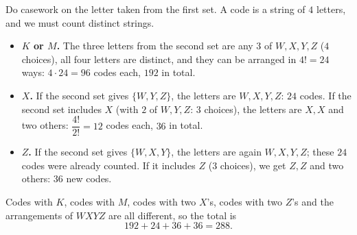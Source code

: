 Do casework on the letter taken from the first set. A code is a string of $4$ letters, and we must count distinct strings.
\begin{itemize}
\item \textbf{$K$ or $M$.} The three letters from the second set are any $3$ of $W,X,Y,Z$ ($4$ choices), all four letters are distinct, and they can be arranged in $4!=24$ ways: $4\cdot24=96$ codes each, $192$ in total.
\item \textbf{$X$.} If the second set gives $\{W,Y,Z\}$, the letters are $W,X,Y,Z$: $24$ codes. If the second set includes $X$ (with $2$ of $W,Y,Z$: $3$ choices), the letters are $X,X$ and two others: $\dfrac{4!}{2!}=12$ codes each, $36$ in total.
\item \textbf{$Z$.} If the second set gives $\{W,X,Y\}$, the letters are again $W,X,Y,Z$; these $24$ codes were already counted. If it includes $Z$ ($3$ choices), we get $Z,Z$ and two others: $36$ new codes.
\end{itemize}
Codes with $K$, codes with $M$, codes with two $X$'s, codes with two $Z$'s and the arrangements of $WXYZ$ are all different, so the total is
\[192+24+36+36=\boxed{288}.\]
